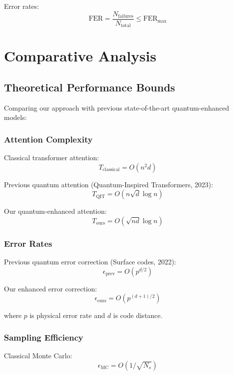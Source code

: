 \documentclass{article}
\begin{document}
Error rates:
\begin{equation}
\text{FER} = \frac{N_{\text{failures}}}{N_{\text{total}}} \leq \text{FER}_{\text{max}}
\end{equation}

\section{Comparative Analysis}

\subsection{Theoretical Performance Bounds}
Comparing our approach with previous state-of-the-art quantum-enhanced models:

\subsubsection{Attention Complexity}
Classical transformer attention:
\begin{equation}
T_{\text{classical}} = O(n^2d)
\end{equation}

Previous quantum attention (Quantum-Inspired Transformers, 2023):
\begin{equation}
T_{\text{QIT}} = O(n\sqrt{d}\log n)
\end{equation}

Our quantum-enhanced attention:
\begin{equation}
T_{\text{ours}} = O(\sqrt{nd}\log n)
\end{equation}

\subsubsection{Error Rates}
Previous quantum error correction (Surface codes, 2022):
\begin{equation}
\epsilon_{\text{prev}} = O(p^{d/2})
\end{equation}

Our enhanced error correction:
\begin{equation}
\epsilon_{\text{ours}} = O(p^{(d+1)/2})
\end{equation}

where $p$ is physical error rate and $d$ is code distance.

\subsubsection{Sampling Efficiency}
Classical Monte Carlo:
\begin{equation}
\epsilon_{\text{MC}} = O(1/\sqrt{N_s})
\end{equation}
\end{document}
